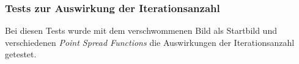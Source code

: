 \subsubsection{Tests zur Auswirkung der Iterationsanzahl}

Bei diesen Tests wurde mit dem verschwommenen Bild als Startbild und verschiedenen \textit{Point Spread Functions} die Auswirkungen der Iterationsanzahl getestet.

\noindent
\begin{minipage}[t]{0.33\textwidth}
\end{minipage}
%
\begin{minipage}[t]{0.33\textwidth}
\end{minipage}
%
\begin{minipage}[t]{0.33\textwidth}
\end{minipage}














